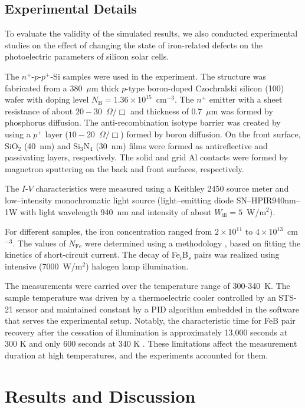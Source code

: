 \documentclass[a4paper,fleqn]{cas-sc}
\begin{document}
\subsection{Experimental Details}

To evaluate the validity of the simulated results,
we also conducted experimental studies on the effect of changing the state of iron-related defects on the photoelectric parameters of silicon solar cells.

The $n^+$-$p$-$p^+$-Si samples were used in the experiment.
The structure was fabricated from a 380~$\mu$m thick $p$-type boron-doped
Czochralski silicon (100) wafer with doping level $N_\mathrm{B}=1.36\times10^{15}$~cm$^{-3}$.
The $n^+$ emitter with a sheet resistance of about $20-30$~$\Omega/\Box$
and  thickness of $0.7$~$\mu$m was formed by phosphorus diffusion.
The anti-recombination isotype barrier was created by using a $p^+$
layer ($10-20$~$\Omega/\Box$) formed by boron diffusion.
On the front surface, SiO$_2$ (40~nm) and Si$_3$N$_4$ (30~nm) films were formed as antireflective and passivating layers, respectively.
The solid and grid Al contacts were formed by magnetron sputtering on the back and front surfaces, respectively.

The $I$-$V$ characteristics were measured using a Keithley 2450 source meter and
low--intensity monochromatic light source (light--emitting diode SN--HPIR940nm--1W with light wavelength 940~nm and intensity of about  $W_\mathrm{ill} = 5$~W/m$^{2}$).

For different samples, the iron concentration ranged from $2\times10^{11}$ to $4\times10^{13}$~cm$^{-3}$.
The values of $N_\mathrm{Fe}$ were determined using a methodology \cite{Olikh2022:JMatSci,Olikh2021JAP}, based on fitting the kinetics of short-circuit current.
The decay of Fe$_i$B$_s$ pairs was realized using intensive (7000~W/$\mathrm{m}^{2}$) halogen lamp illumination.

The measurements were carried over the temperature range of 300-340~K.
The sample temperature was driven by a thermoelectric cooler controlled by an STS-21 sensor
and maintained constant by a PID algorithm embedded in the software that serves the experimental setup.
Notably, the characteristic time for FeB pair recovery after the cessation of illumination is approximately 13,000 seconds at 300 K and only 600 seconds at 340 K \cite{FeBAssJAP2014,FeBKin2019}.
These limitations affect the measurement duration at high temperatures, and the experiments accounted for them.

\section{Results and Discussion}%
\end{document}
